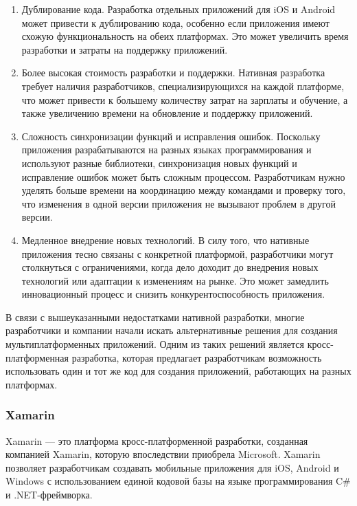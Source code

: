 \documentclass[14pt, russian]{scrartcl}
\begin{document}
\begin{enumerate}
    \item Дублирование кода. Разработка отдельных приложений для iOS и Android может привести к дублированию кода, особенно если приложения имеют схожую функциональность на обеих платформах. Это может увеличить время разработки и затраты на поддержку приложений.
    \item Более высокая стоимость разработки и поддержки. Нативная разработка требует наличия разработчиков, специализирующихся на каждой платформе, что может привести к большему количеству затрат на зарплаты и обучение, а также увеличению времени на обновление и поддержку приложений.
    \item Сложность синхронизации функций и исправления ошибок. Поскольку приложения разрабатываются на разных языках программирования и используют разные библиотеки, синхронизация новых функций и исправление ошибок может быть сложным процессом. Разработчикам нужно уделять больше времени на координацию между командами и проверку того, что изменения в одной версии приложения не вызывают проблем в другой версии.
    \item Медленное внедрение новых технологий. В силу того, что нативные приложения тесно связаны с конкретной платформой, разработчики могут столкнуться с ограничениями, когда дело доходит до внедрения новых технологий или адаптации к изменениям на рынке. Это может замедлить инновационный процесс и снизить конкурентоспособность приложения.
\end{enumerate}

В связи с вышеуказанными недостатками нативной разработки, многие разработчики и компании начали искать альтернативные решения для создания мультиплатформенных приложений. Одним из таких решений является кросс-платформенная разработка, которая предлагает разработчикам возможность использовать один и тот же код для создания приложений, работающих на разных платформах.

\subsubsection{Xamarin}\label{sect:xamarin}

Xamarin\cite{xamarin, xamarin-intro} --- это платформа кросс-платформенной разработки, созданная компанией Xamarin, которую впоследствии приобрела Microsoft. Xamarin позволяет разработчикам создавать мобильные приложения для iOS, Android и Windows с использованием единой кодовой базы на языке программирования C\# и .NET-фреймворка.
\end{document}
